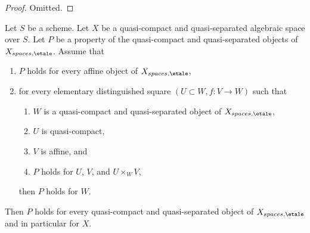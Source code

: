 \begin{proof}
Omitted.
\end{proof}

\begin{lemma}
\label{lemma-induction-principle}
Let $S$ be a scheme. Let $X$ be a quasi-compact and quasi-separated
algebraic space over $S$. Let $P$ be a property of the quasi-compact
and quasi-separated objects of $X_{spaces, \etale}$. Assume that
\begin{enumerate}
\item $P$ holds for every affine object of $X_{spaces, \etale}$,
\item for every elementary distinguished square $(U \subset W, f : V \to W)$
such that
\begin{enumerate}
\item $W$ is a quasi-compact and quasi-separated object of
$X_{spaces, \etale}$,
\item $U$ is quasi-compact,
\item $V$ is affine, and
\item $P$ holds for $U$, $V$, and $U \times_W V$,
\end{enumerate}
then $P$ holds for $W$.
\end{enumerate}
Then $P$ holds for every quasi-compact and quasi-separated object
of $X_{spaces, \etale}$ and in particular for $X$.
\end{lemma}

